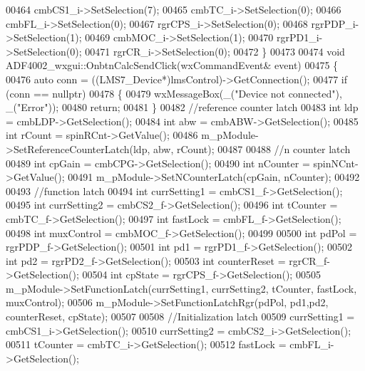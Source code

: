 \begin{DoxyCode}
{00464     cmbCS1\_i->SetSelection(7);
00465     cmbTC\_i->SetSelection(0);
00466     cmbFL\_i->SetSelection(0);
00467     rgrCPS\_i->SetSelection(0);
00468     rgrPDP\_i->SetSelection(1);
00469     cmbMOC\_i->SetSelection(1);
00470     rgrPD1\_i->SetSelection(0);
00471     rgrCR\_i->SetSelection(0);
00472 \}
00473 
00474 \textcolor{keywordtype}{void} ADF4002_wxgui::OnbtnCalcSendClick(wxCommandEvent& event)
00475 \{
00476     \textcolor{keyword}{auto} conn =  ((LMS7_Device*)lmsControl)->GetConnection();
00477     \textcolor{keywordflow}{if} (conn == \textcolor{keyword}{nullptr})
00478     \{
00479         wxMessageBox(\_(\textcolor{stringliteral}{"Device not connected"}), \_(\textcolor{stringliteral}{"Error"}));
00480         \textcolor{keywordflow}{return};
00481     \}
00482     \textcolor{comment}{//reference counter latch}
00483     \textcolor{keywordtype}{int} ldp = cmbLDP->GetSelection();
00484     \textcolor{keywordtype}{int} abw = cmbABW->GetSelection();
00485     \textcolor{keywordtype}{int} rCount = spinRCnt->GetValue();
00486     m\_pModule->SetReferenceCounterLatch(ldp, abw, rCount);
00487 
00488     \textcolor{comment}{//n counter latch}
00489     \textcolor{keywordtype}{int} cpGain = cmbCPG->GetSelection();
00490     \textcolor{keywordtype}{int} nCounter = spinNCnt->GetValue();
00491     m\_pModule->SetNCounterLatch(cpGain, nCounter);
00492 
00493     \textcolor{comment}{//function latch}
00494     \textcolor{keywordtype}{int} currSetting1 = cmbCS1\_f->GetSelection();
00495     \textcolor{keywordtype}{int} currSetting2 = cmbCS2\_f->GetSelection();
00496     \textcolor{keywordtype}{int} tCounter = cmbTC\_f->GetSelection();
00497     \textcolor{keywordtype}{int} fastLock = cmbFL\_f->GetSelection();
00498     \textcolor{keywordtype}{int} muxControl = cmbMOC\_f->GetSelection();
00499 
00500     \textcolor{keywordtype}{int} pdPol = rgrPDP\_f->GetSelection();
00501     \textcolor{keywordtype}{int} pd1 = rgrPD1\_f->GetSelection();
00502     \textcolor{keywordtype}{int} pd2 = rgrPD2\_f->GetSelection();
00503     \textcolor{keywordtype}{int} counterReset = rgrCR\_f->GetSelection();
00504     \textcolor{keywordtype}{int} cpState = rgrCPS\_f->GetSelection();
00505     m\_pModule->SetFunctionLatch(currSetting1, currSetting2, tCounter, fastLock, muxControl);
00506     m\_pModule->SetFunctionLatchRgr(pdPol, pd1,pd2, counterReset, cpState);
00507 
00508     \textcolor{comment}{//Initialization latch}
00509     currSetting1 = cmbCS1\_i->GetSelection();
00510     currSetting2 = cmbCS2\_i->GetSelection();
00511     tCounter = cmbTC\_i->GetSelection();
00512     fastLock = cmbFL\_i->GetSelection();
}
\end{DoxyCode}
